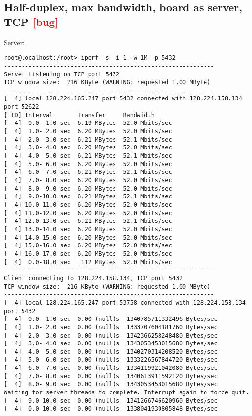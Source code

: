 \documentclass[a4paper]{report}
\begin{document}
\subsection{Half-duplex, max bandwidth, board as server, TCP \textcolor{red}{[bug]}}
Server:
\begin{lstlisting}
root@localhost:/root> iperf -s -i 1 -w 1M -p 5432
------------------------------------------------------------
Server listening on TCP port 5432
TCP window size:  216 KByte (WARNING: requested 1.00 MByte)
------------------------------------------------------------
[  4] local 128.224.165.247 port 5432 connected with 128.224.158.134 port 52622
[ ID] Interval       Transfer     Bandwidth
[  4]  0.0- 1.0 sec  6.19 MBytes  52.0 Mbits/sec
[  4]  1.0- 2.0 sec  6.20 MBytes  52.0 Mbits/sec
[  4]  2.0- 3.0 sec  6.21 MBytes  52.1 Mbits/sec
[  4]  3.0- 4.0 sec  6.20 MBytes  52.0 Mbits/sec
[  4]  4.0- 5.0 sec  6.21 MBytes  52.1 Mbits/sec
[  4]  5.0- 6.0 sec  6.20 MBytes  52.0 Mbits/sec
[  4]  6.0- 7.0 sec  6.21 MBytes  52.1 Mbits/sec
[  4]  7.0- 8.0 sec  6.20 MBytes  52.0 Mbits/sec
[  4]  8.0- 9.0 sec  6.20 MBytes  52.0 Mbits/sec
[  4]  9.0-10.0 sec  6.21 MBytes  52.1 Mbits/sec
[  4] 10.0-11.0 sec  6.20 MBytes  52.0 Mbits/sec
[  4] 11.0-12.0 sec  6.20 MBytes  52.0 Mbits/sec
[  4] 12.0-13.0 sec  6.21 MBytes  52.1 Mbits/sec
[  4] 13.0-14.0 sec  6.20 MBytes  52.0 Mbits/sec
[  4] 14.0-15.0 sec  6.20 MBytes  52.0 Mbits/sec
[  4] 15.0-16.0 sec  6.20 MBytes  52.0 Mbits/sec
[  4] 16.0-17.0 sec  6.20 MBytes  52.0 Mbits/sec
[  4]  0.0-18.0 sec   112 MBytes  52.0 Mbits/sec
------------------------------------------------------------
Client connecting to 128.224.158.134, TCP port 5432
TCP window size:  216 KByte (WARNING: requested 1.00 MByte)
------------------------------------------------------------
[  4] local 128.224.165.247 port 53758 connected with 128.224.158.134 port 5432
[  4]  0.0- 1.0 sec  0.00 (null)s  1340785711332496 Bytes/sec
[  4]  1.0- 2.0 sec  0.00 (null)s  1333707604181760 Bytes/sec
[  4]  2.0- 3.0 sec  0.00 (null)s  1342366258248480 Bytes/sec
[  4]  3.0- 4.0 sec  0.00 (null)s  1343053453015680 Bytes/sec
[  4]  4.0- 5.0 sec  0.00 (null)s  1340270314208520 Bytes/sec
[  4]  5.0- 6.0 sec  0.00 (null)s  1333226567844720 Bytes/sec
[  4]  6.0- 7.0 sec  0.00 (null)s  1334119921042080 Bytes/sec
[  4]  7.0- 8.0 sec  0.00 (null)s  1340613911592120 Bytes/sec
[  4]  8.0- 9.0 sec  0.00 (null)s  1343053453015680 Bytes/sec
Waiting for server threads to complete. Interrupt again to force quit.
[  4]  9.0-10.0 sec  0.00 (null)s  1341266746620960 Bytes/sec
[  4]  0.0-10.0 sec  0.00 (null)s  1338041930805848 Bytes/sec
\end{lstlisting}
\end{document}
